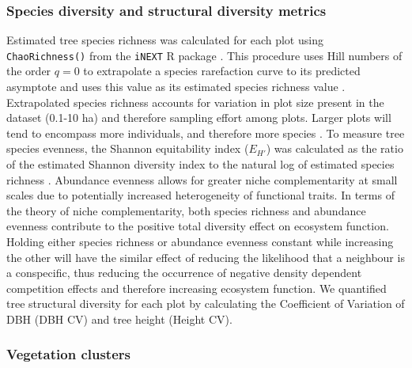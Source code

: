 \begin{refsection}
\subsubsection{Species diversity and structural diversity metrics}
\label{befr:sssec:diversity}

Estimated tree species richness was calculated for each plot using \texttt{ChaoRichness()} from the \texttt{iNEXT} R package \citep{Hsieh2016}. This procedure uses Hill numbers of the order $q=0$ to extrapolate a species rarefaction curve to its predicted asymptote and uses this value as its estimated species richness value \citep{Jost2006}. Extrapolated species richness accounts for variation in plot size present in the dataset (0.1-10 ha) and therefore sampling effort among plots. Larger plots will tend to encompass more individuals, and therefore more species \citep{Dengler2009}. To measure tree species evenness, the Shannon equitability index ($E_{H'}$) was calculated as the ratio of the estimated Shannon diversity index to the natural log of estimated species richness \citep{Smith1996}. Abundance evenness allows for greater niche complementarity at small scales due to potentially increased heterogeneity of functional traits. In terms of the theory of niche complementarity, both species richness and abundance evenness contribute to the positive total diversity effect on ecosystem function. Holding either species richness or abundance evenness constant while increasing the other will have the similar effect of reducing the likelihood that a neighbour is a conspecific, thus reducing the occurrence of negative density dependent competition effects and therefore increasing ecosystem function. We quantified tree structural diversity for each plot by calculating the Coefficient of Variation of DBH (DBH CV) and tree height (Height CV). 

\subsubsection{Vegetation clusters}
\label{befr:sssec:clusters}


\end{refsection}
